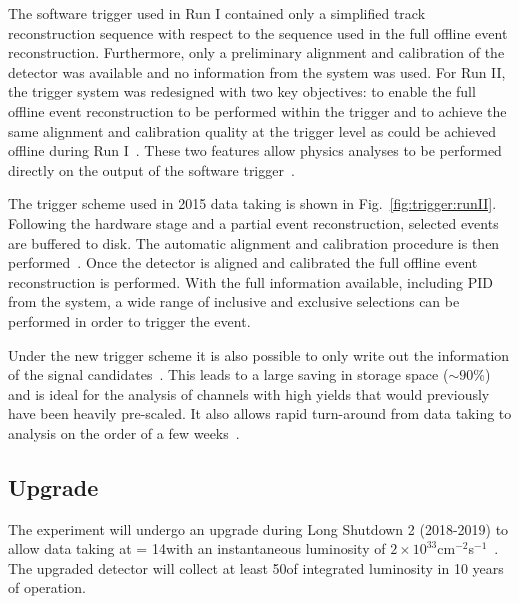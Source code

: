 The software trigger used in Run I contained only a simplified track reconstruction sequence with respect to the sequence used in the full offline event reconstruction. Furthermore, only a preliminary alignment and calibration of the detector was available and no information from the \rich system was used. For Run II, the trigger system was redesigned with two key objectives: to enable the full offline event reconstruction to be performed within the trigger and to achieve the same alignment and calibration quality at the trigger level as could be achieved offline during Run I~\cite{hlt-runII}. These two features allow physics analyses to be performed directly on the output of the software trigger~\cite{turbo}.

The trigger scheme used in 2015 data taking is shown in Fig.~\ref{fig:trigger:runII}. Following the hardware stage and a partial event reconstruction, selected events are buffered to disk. The automatic alignment and calibration procedure is then performed~\cite{alignment}. Once the detector is aligned and calibrated the full offline event reconstruction is performed. With the full information available, including PID from the \rich system, a wide range of inclusive and exclusive selections can be performed in order to trigger the event.

 Under the new trigger scheme it is also possible to only write out the information of the signal candidates~\cite{turbo}. This leads to a large saving in storage space ($\sim 90$\%) and is ideal for the analysis of channels with high yields that would previously have been heavily pre-scaled. It also allows rapid turn-around from data taking to analysis on the order of a few weeks~\cite{jpsi-em,charm-em}.

\subsection{\lhcb Upgrade}
\label{sec:lhcb:lhcb-upgrade}

The \lhcb experiment will undergo an upgrade during Long Shutdown 2 (2018-2019) to allow data taking at \sqs = 14\tev with an instantaneous luminosity of $2\times10^{33}$cm$^{-2}$s$^{-1}$~\cite{upgrade-loi,upgrade-tdr}. The upgraded detector will collect at least 50\invfb of integrated luminosity in 10 years of operation.


